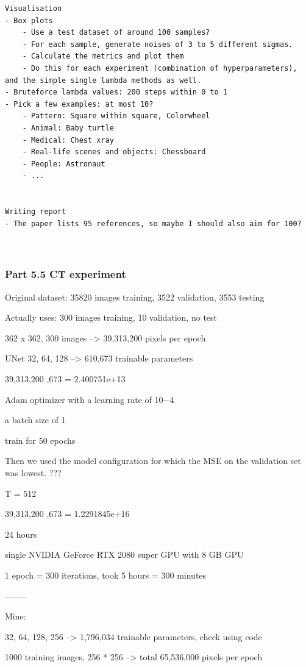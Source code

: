 \documentclass[12pt]{article}
\begin{document}
\begin{verbatim}
Visualisation
- Box plots
    - Use a test dataset of around 100 samples?
    - For each sample, generate noises of 3 to 5 different sigmas. 
    - Calculate the metrics and plot them
    - Do this for each experiment (combination of hyperparameters), and the simple single lambda methods as well. 
- Bruteforce lambda values: 200 steps within 0 to 1
- Pick a few examples: at most 10?
    - Pattern: Square within square, Colorwheel
    - Animal: Baby turtle
    - Medical: Chest xray
    - Real-life scenes and objects: Chessboard
    - People: Astronaut
    - ...


Writing report
- The paper lists 95 references, so maybe I should also aim for 100?

    
\end{verbatim}

\subsubsection{Part 5.5 CT experiment}

Original dataset: 35820 images training, 3522 validation, 3553 testing

Actually uses: 300 images training, 10 validation, no test

362 x 362, 300 images --> 39,313,200 pixels per epoch

UNet 32, 64, 128 --> 610,673 trainable parameters

39,313,200  ,673  =  2.400751e+13

Adam optimizer with a learning rate of 10−4

a batch size of 1

train for 50 epochs

Then we used the model configuration for which the MSE on the validation set was lowest. ???

T = 512

39,313,200  ,673    =  1.2291845e+16 

24 hours

single NVIDIA GeForce RTX 2080 super GPU with 8 GB GPU

1 epoch = 300 iterations, took 5 hours = 300 minutes


--------

Mine: 


32, 64, 128, 256 --> 1,796,034 trainable parameters, check using code

1000 training images, 256 * 256 --> total 65,536,000 pixels per epoch
\end{document}
